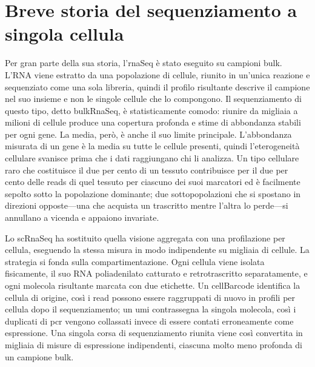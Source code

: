 \section{Breve storia del sequenziamento a singola cellula}
Per gran parte della sua storia, l'\gls{rnaSeq} è stato eseguito su campioni bulk. L'RNA viene estratto da una popolazione di cellule, riunito in un'unica reazione e sequenziato come una sola libreria, quindi il profilo risultante descrive il campione nel suo insieme e non le singole cellule che lo compongono. Il sequenziamento di questo tipo, detto \gls{bulkRnaSeq}, è statisticamente comodo: riunire da migliaia a milioni di cellule produce una copertura profonda e stime di abbondanza stabili per ogni gene. La media, però, è anche il suo limite principale. L'abbondanza misurata di un gene è la media su tutte le cellule presenti, quindi l'eterogeneità cellulare svanisce prima che i dati raggiungano chi li analizza. Un tipo cellulare raro che costituisce il due per cento di un tessuto contribuisce per il due per cento delle \glspl{read} di quel tessuto per ciascuno dei suoi marcatori ed è facilmente sepolto sotto la popolazione dominante; due sottopopolazioni che si spostano in direzioni opposte---una che acquista un trascritto mentre l'altra lo perde---si annullano a vicenda e appaiono invariate.

Lo \gls{scRnaSeq} ha sostituito quella visione aggregata con una profilazione per cellula, eseguendo la stessa misura in modo indipendente su migliaia di cellule. La strategia si fonda sulla compartimentazione. Ogni cellula viene isolata fisicamente, il suo RNA poliadenilato catturato e retrotrascritto separatamente, e ogni molecola risultante marcata con due etichette. Un \gls{cellBarcode} identifica la cellula di origine, così i read possono essere raggruppati di nuovo in profili per cellula dopo il sequenziamento; un \gls{umi} contrassegna la singola molecola, così i duplicati di \gls{pcr} vengono collassati invece di essere contati erroneamente come espressione. Una singola corsa di sequenziamento riunita viene così convertita in migliaia di misure di espressione indipendenti, ciascuna molto meno profonda di un campione bulk.

